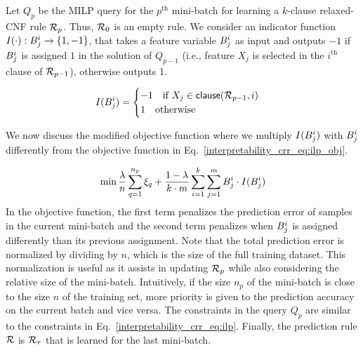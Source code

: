 Let  $ Q_p $ be the MILP query for the $ p^\text{th} $ mini-batch for learning a $ k $-clause relaxed-CNF rule $ {\mathcal{R}}_p $. Thus, $ {\mathcal{R}}_0 $ is an empty rule.
We consider an indicator function $ I(\cdot): B^i_j \rightarrow \{1,-1\} $, that takes a feature variable $ B^i_j $ as input and outputs $ -1 $  if $ B^i_j $ is assigned $ 1 $ in the solution of $ Q_{p-1} $ (i.e., feature $ X_j $ is selected in the $ i^\text{th} $ clause of   $ {\mathcal{R}}_{p-1} $), otherwise outputs 1.

\[
I(B^i_j)=
\begin{cases}
-1 \quad \text{if }  X_j \in \mathsf{clause}({\mathcal{R}}_{p-1},i)
\\
1 \quad \text{otherwise}
\end{cases}
\]

We now discuss the modified objective function where we multiply $ I(B^i_j) $ with $ B^i_j $ differently  from the objective function in Eq.~\ref{interpretability_crr_eq:ilp_obj}.

\begin{equation}
\label{interpretability_crr_eq:ilp_inc}
	\begin{split}
	&\min  \frac{\lambda}{n} \sum_{q=1}^{n_p} \xi_q  +  \frac{1-\lambda}{k\cdot m} \sum_{i=1}^k\sum_{j=1}^m B_j^i \cdot I(B^i_j) \\
	\end{split}
\end{equation}
In the objective function, the first term penalizes the prediction error of samples in the current mini-batch and the second term penalizes when $ B_j^i $ is assigned differently than its previous  assignment. Note that the total prediction error is normalized by dividing by $ n $, which is the size of the full training dataset. This normalization is useful as it assists in updating $ {\mathcal{R}}_p $ while also considering the relative size of the mini-batch. Intuitively, if the size $ n_p $ of the mini-batch  is close to the size $ n $
of the training set, more priority is given to the prediction accuracy on the current batch and vice versa. The constraints in the  query $ Q_p $ are similar to the constraints in Eq.~\ref{interpretability_crr_eq:ilp}.  
Finally, the prediction rule  $ {\mathcal{R}} $ is  $ {\mathcal{R}}_\tau $ that is learned for the last mini-batch. 




